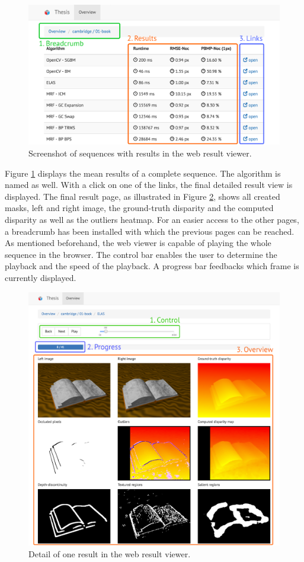 \begin{figure}[h!]
  \centering
  \includegraphics[width=1.0\textwidth]{src/images/result-viewer-overview2.png}
  \caption[Screenshot of sequences in the web result viewer]{Screenshot of sequences with results in the web result viewer.}
  \label{fig:web-overview2}
\end{figure}

\noindent Figure \ref{fig:web-overview2} displays the mean results of a complete sequence.
The algorithm is named as well.
With a click on one of the links, the final detailed result view is displayed.
The final result page, as illustrated in Figure \ref{fig:web-detail}, shows all created masks, left and right image, the ground-truth disparity and the computed disparity as well as the outliers heatmap.
For an easier access to the other pages, a breadcrumb has been installed with which the previous pages can be reached.
As mentioned beforehand, the web viewer is capable of playing the whole sequence in the browser.
The control bar enables the user to determine the playback and the speed of the playback.
A progress bar feedbacks which frame is currently displayed.

\begin{figure}[p!]
  \centering
  \includegraphics[width=1.0\textwidth]{src/images/result-viewer-detail.png}
  \caption[Detail of one result in the web result viewer]{Detail of one result in the web result viewer.}
  \label{fig:web-detail}
\end{figure}
